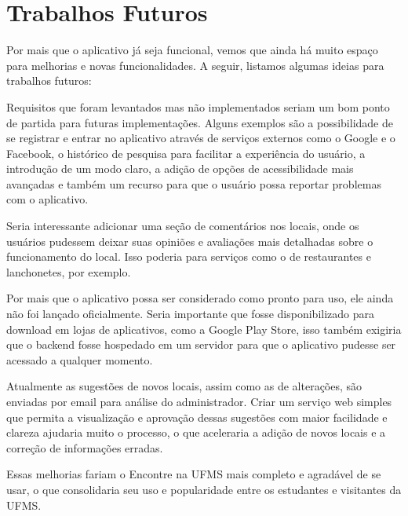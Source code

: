 \section{Trabalhos Futuros}
\label{sec:trabalhos_futuros}

    Por mais que o aplicativo já seja funcional, vemos que ainda há muito espaço para melhorias e novas funcionalidades. A seguir, listamos algumas ideias para trabalhos futuros:
    
    Requisitos que foram levantados mas não implementados seriam um bom ponto de partida para futuras implementações. Alguns exemplos são a possibilidade de se registrar e entrar no aplicativo através de serviços externos como o Google e o Facebook, o histórico de pesquisa para facilitar a experiência do usuário, a introdução de um modo claro, a adição de opções de acessibilidade mais avançadas e também um recurso para que o usuário possa reportar problemas com o aplicativo.
    
    Seria interessante adicionar uma seção de comentários nos locais, onde os usuários pudessem deixar suas opiniões e avaliações mais detalhadas sobre o funcionamento do local. Isso poderia para serviços como o de restaurantes e lanchonetes, por exemplo.

    Por mais que o aplicativo possa ser considerado como pronto para uso, ele ainda não foi lançado oficialmente. Seria importante que fosse disponibilizado para download em lojas de aplicativos, como a Google Play Store, isso também exigiria que o backend fosse hospedado em um servidor para que o aplicativo pudesse ser acessado a qualquer momento.

    Atualmente as sugestões de novos locais, assim como as de alterações, são enviadas por email para análise do administrador. Criar um serviço web simples que permita a visualização e aprovação dessas sugestões com maior facilidade e clareza ajudaria muito o processo, o que aceleraria a adição de novos locais e a correção de informações erradas.

    Essas melhorias fariam o Encontre na UFMS mais completo e agradável de se usar, o que consolidaria seu uso e popularidade entre os estudantes e visitantes da UFMS.